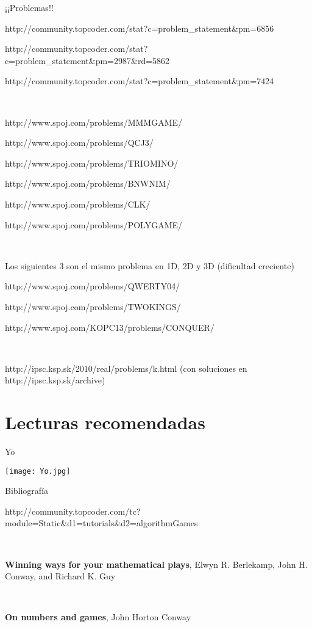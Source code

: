 \documentclass{beamer}
\begin{document}
\begin{frame}{¡¡Problemas!!}

    {\tiny

    http://community.topcoder.com/stat?c=problem\_statement\&pm=6856
    
    http://community.topcoder.com/stat?c=problem\_statement\&pm=2987\&rd=5862
    
    http://community.topcoder.com/stat?c=problem\_statement\&pm=7424
    
    \
    
    http://www.spoj.com/problems/MMMGAME/
    
    http://www.spoj.com/problems/QCJ3/
    
    http://www.spoj.com/problems/TRIOMINO/
    
    http://www.spoj.com/problems/BNWNIM/
    
    http://www.spoj.com/problems/CLK/
    
    http://www.spoj.com/problems/POLYGAME/

    \ 

    Los siguientes 3 son el mismo problema en 1D, 2D y 3D (dificultad creciente)
    
    http://www.spoj.com/problems/QWERTY04/
    
    http://www.spoj.com/problems/TWOKINGS/
    
    http://www.spoj.com/KOPC13/problems/CONQUER/

    \ 

    http://ipsc.ksp.sk/2010/real/problems/k.html (con soluciones en http://ipsc.ksp.sk/archive)}

\end{frame}

\section{Lecturas recomendadas}

\begin{frame}{Yo}

\texttt{[image: Yo.jpg]}
\end{frame}



\begin{frame}{Bibliografía}

    {\tiny

    http://community.topcoder.com/tc?module=Static\&d1=tutorials\&d2=algorithmGames

    \

    \textbf{Winning ways for your mathematical plays},  Elwyn R. Berlekamp, John H. Conway, and Richard K. Guy

    \

    \textbf{On numbers and games}, John Horton Conway}

\end{frame}
\end{document}
